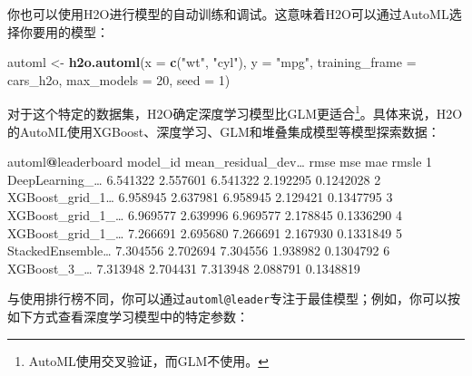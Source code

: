 \documentclass[
]{article}
\newenvironment{Shaded}{\begin{snugshade}}{\end{snugshade}}
\newcommand{\DataTypeTok}[1]{\textcolor[rgb]{0.13,0.29,0.53}{#1}}
\newcommand{\DecValTok}[1]{\textcolor[rgb]{0.00,0.00,0.81}{#1}}
\newcommand{\FloatTok}[1]{\textcolor[rgb]{0.00,0.00,0.81}{#1}}
\newcommand{\KeywordTok}[1]{\textcolor[rgb]{0.13,0.29,0.53}{\textbf{#1}}}
\newcommand{\NormalTok}[1]{#1}
\newcommand{\OperatorTok}[1]{\textcolor[rgb]{0.81,0.36,0.00}{\textbf{#1}}}
\newcommand{\StringTok}[1]{\textcolor[rgb]{0.31,0.60,0.02}{#1}}
\begin{document}
你也可以使用H2O进行模型的自动训练和调试。这意味着H2O可以通过AutoML选择你要用的模型：

\begin{Shaded}
\begin{Highlighting}[]
\NormalTok{automl <-}\StringTok{ }\KeywordTok{h2o.automl}\NormalTok{(}\DataTypeTok{x =} \KeywordTok{c}\NormalTok{(}\StringTok{"wt"}\NormalTok{, }\StringTok{"cyl"}\NormalTok{), }\DataTypeTok{y =} \StringTok{"mpg"}\NormalTok{, }\DataTypeTok{training_frame =}\NormalTok{ cars_h2o, }\DataTypeTok{max_models =} \DecValTok{20}\NormalTok{, }
    \DataTypeTok{seed =} \DecValTok{1}\NormalTok{)}
\end{Highlighting}
\end{Shaded}

对于这个特定的数据集，H2O确定深度学习模型比GLM更适合\footnote{AutoML使用交叉验证，而GLM不使用。}。具体来说，H2O的AutoML使用XGBoost、深度学习、GLM和堆叠集成模型等模型探索数据：

\begin{Shaded}
\begin{Highlighting}[]
\NormalTok{automl}\OperatorTok{@}\NormalTok{leaderboard}
\NormalTok{model_id mean_residual_dev… rmse mse mae rmsle}
\DecValTok{1}\NormalTok{ DeepLearning_… }\FloatTok{6.541322} \FloatTok{2.557601} \FloatTok{6.541322} \FloatTok{2.192295} \FloatTok{0.1242028}
\DecValTok{2}\NormalTok{ XGBoost_grid_1… }\FloatTok{6.958945} \FloatTok{2.637981} \FloatTok{6.958945} \FloatTok{2.129421} \FloatTok{0.1347795}
\DecValTok{3}\NormalTok{ XGBoost_grid_}\DecValTok{1}\NormalTok{_… }\FloatTok{6.969577} \FloatTok{2.639996} \FloatTok{6.969577} \FloatTok{2.178845} \FloatTok{0.1336290}
\DecValTok{4}\NormalTok{ XGBoost_grid_}\DecValTok{1}\NormalTok{_… }\FloatTok{7.266691} \FloatTok{2.695680} \FloatTok{7.266691} \FloatTok{2.167930} \FloatTok{0.1331849}
\DecValTok{5}\NormalTok{ StackedEnsemble… }\FloatTok{7.304556} \FloatTok{2.702694} \FloatTok{7.304556} \FloatTok{1.938982} \FloatTok{0.1304792}
\DecValTok{6}\NormalTok{ XGBoost_}\DecValTok{3}\NormalTok{_… }\FloatTok{7.313948} \FloatTok{2.704431} \FloatTok{7.313948} \FloatTok{2.088791} \FloatTok{0.1348819}
\end{Highlighting}
\end{Shaded}

与使用排行榜不同，你可以通过\texttt{automl@leader}专注于最佳模型；例如，你可以按如下方式查看深度学习模型中的特定参数：
\end{document}
